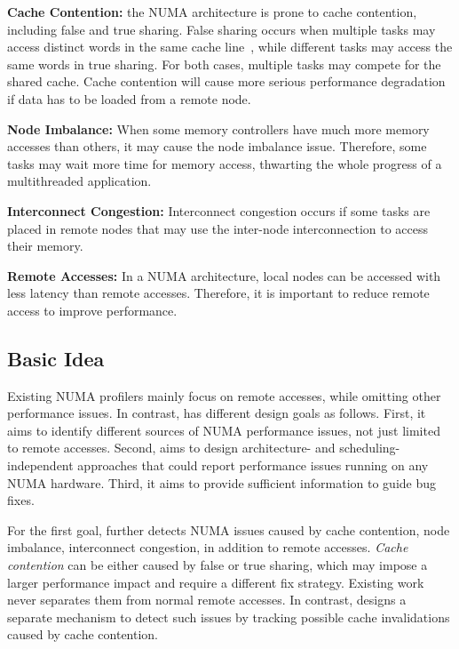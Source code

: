 \textbf{Cache Contention:} the NUMA architecture is prone to cache contention, including false and true sharing. False sharing occurs when multiple tasks may access distinct words in the same cache line~\cite{Hoard}, while different tasks may access the same words in true sharing. For both cases, multiple tasks may compete for the shared cache. Cache contention will cause more serious performance degradation if data has to be loaded from a remote node. 
 
\textbf{Node Imbalance:} When some memory controllers have much more memory accesses than others, it may cause the node imbalance issue.
Therefore, some tasks may wait more time for memory access, thwarting the whole progress of a multithreaded application. 

\textbf{Interconnect Congestion:} Interconnect congestion occurs if some tasks are placed in remote nodes that may use the inter-node interconnection to access their memory. 

\textbf{Remote Accesses:} In a NUMA architecture, local nodes can be accessed with less latency than remote accesses. 
Therefore, it is important to reduce remote access to improve performance.



\subsection{Basic Idea}
\label{sec:idea}

 
Existing NUMA profilers mainly focus on remote accesses, while omitting other performance issues. In contrast, \NP{} has different design goals as follows.  First, it aims to identify different sources of NUMA performance issues, not just limited to remote accesses. Second, \NP{} aims to design architecture- and scheduling-independent approaches that could report performance issues running on any NUMA hardware. Third, it aims to provide sufficient information to guide bug fixes.  

For the first goal, \NP{} further detects NUMA issues caused by cache contention, node imbalance, interconnect congestion, in addition to remote accesses.  \textit{Cache contention} can be either caused by false or true sharing, which may impose a larger performance impact and require a different fix strategy. Existing work never separates them from normal remote accesses. In contrast, \NP{} designs a separate mechanism to detect such issues by tracking possible cache invalidations caused by cache contention. 

